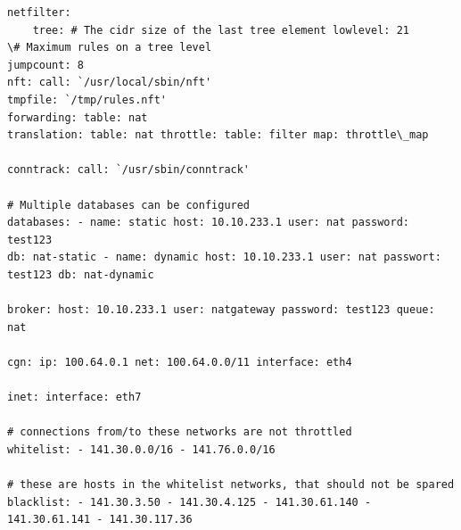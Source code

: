 \documentclass{report}
\begin{document}
\begin{verbatim}
netfilter: 
	tree: # The cidr size of the last tree element lowlevel: 21
\# Maximum rules on a tree level 
jumpcount: 8 
nft: call: `/usr/local/sbin/nft'
tmpfile: `/tmp/rules.nft'
forwarding: table: nat
translation: table: nat throttle: table: filter map: throttle\_map

conntrack: call: `/usr/sbin/conntrack'

# Multiple databases can be configured
databases: - name: static host: 10.10.233.1 user: nat password: test123
db: nat-static - name: dynamic host: 10.10.233.1 user: nat passwort:
test123 db: nat-dynamic

broker: host: 10.10.233.1 user: natgateway password: test123 queue: nat

cgn: ip: 100.64.0.1 net: 100.64.0.0/11 interface: eth4

inet: interface: eth7

# connections from/to these networks are not throttled
whitelist: - 141.30.0.0/16 - 141.76.0.0/16

# these are hosts in the whitelist networks, that should not be spared
blacklist: - 141.30.3.50 - 141.30.4.125 - 141.30.61.140 - 141.30.61.141 - 141.30.117.36
\end{verbatim}


{}

\end{document}

